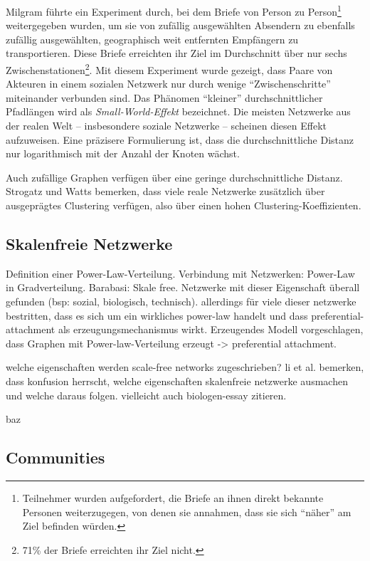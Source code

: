 Milgram f\"uhrte ein Experiment durch, bei dem Briefe von Person zu
Person\footnote{Teilnehmer wurden aufgefordert, die Briefe an ihnen
  direkt bekannte Personen weiterzugegen, von denen sie annahmen, dass
  sie sich ``n\"aher'' am Ziel befinden w\"urden.} weitergegeben
wurden, um sie von zuf\"allig ausgew\"ahlten Absendern zu ebenfalls
zuf\"allig ausgew\"ahlten, geographisch weit entfernten Empf\"angern
zu transportieren\cite{Travers1969}. Diese Briefe erreichten ihr Ziel
im Durchschnitt \"uber nur sechs Zwischenstationen\footnote{71\% der
  Briefe erreichten ihr Ziel nicht.}. Mit diesem Experiment wurde
gezeigt, dass Paare von Akteuren in einem sozialen Netzwerk nur durch
wenige ``Zwischenschritte'' miteinander verbunden sind. Das Ph\"anomen
``kleiner'' durchschnittlicher Pfadl\"angen wird als
\emph{Small-World-Effekt} bezeichnet. Die meisten Netzwerke aus der
realen Welt -- insbesondere soziale Netzwerke -- scheinen diesen
Effekt aufzuweisen\cite{newman:167}. Eine pr\"azisere Formulierung
ist, dass die durchschnittliche Distanz nur logarithmisch mit der
Anzahl der Knoten w\"achst.

Auch zuf\"allige Graphen verf\"ugen \"uber eine geringe
durchschnittliche Distanz. Strogatz und Watts bemerken, dass viele
reale Netzwerke zus\"atzlich \"uber ausgepr\"agtes Clustering
verf\"ugen, also \"uber einen hohen
Clustering-Koeffizienten\cite{Watts1998}.

\subsection{Skalenfreie Netzwerke}
\label{sec:skal-netzw}

Definition einer Power-Law-Verteilung. Verbindung mit Netzwerken:
Power-Law in Gradverteilung. Barabasi: Skale free. Netzwerke mit
dieser Eigenschaft \"uberall gefunden (bsp: sozial, biologisch,
technisch). allerdings f\"ur viele dieser netzwerke bestritten, dass
es sich um ein wirkliches power-law handelt und dass
preferential-attachment als erzeugungsmechanismus wirkt. Erzeugendes
Modell vorgeschlagen, dass Graphen mit Power-law-Verteilung erzeugt ->
preferential attachment.

welche eigenschaften werden scale-free networks zugeschrieben? li et
al. bemerken, dass konfusion herrscht, welche eigenschaften
skalenfreie netzwerke ausmachen und welche daraus folgen. vielleicht
auch biologen-essay zitieren.

\cite{Barabasi1999} 
baz

\subsection{Communities}
\label{ch:Grundlagen:sec:Netzwerkanalyse:subsec:Communities}

